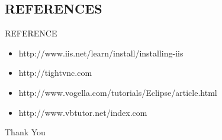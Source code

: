  \subsection{REFERENCES}
  \begin{frame}{REFERENCE}
  \begin{itemize}
  \item http://www.iis.net/learn/install/installing-iis
  \item http://tightvnc.com
  \item http://www.vogella.com/tutorials/Eclipse/article.html
  \item http://www.vbtutor.net/index.com
  \end{itemize}
  \end{frame}
  
  
 
\begin{frame}
\centerline{Thank You}
\end{frame}



